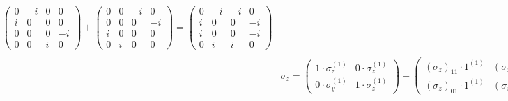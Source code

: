 \documentclass[10pt, a4paper]{article}
\begin{document}
\begin{align*}
\begin{pmatrix}
        0 & -i & 0 & 0\\
        i & 0 & 0 & 0\\
        0 & 0 & 0 & -i\\
        0 & 0 & i & 0
    \end{pmatrix} + 
    \begin{pmatrix}
        0 & 0 & -i & 0\\
        0 & 0 & 0 & -i\\
        i & 0 & 0 & 0\\
        0 & i & 0 & 0
    \end{pmatrix}
    =
    \begin{pmatrix}
        0 & -i & -i & 0\\
        i & 0 & 0 & -i\\
        i & 0 & 0 & -i\\
        0 & i & i & 0
    \end{pmatrix}\\
    &\sigma_z = \begin{pmatrix}1\cdot\sigma_z^{(1)} & 0\cdot\sigma_z^{(1)}\\0\cdot\sigma_y^{(1)} & 1\cdot\sigma_z^{(1)}\end{pmatrix} + \begin{pmatrix}(\sigma_{z})_{11}\cdot 1^{(1)} & (\sigma_{z})_{10}\cdot 1^{(1)}\\(\sigma_{z})_{01}\cdot 1^{(1)}& (\sigma_{z})_{00}\cdot 1^{(1)}\end{pmatrix}=
    \begin{pmatrix}
        1 & 0 & 0 & 0\\
        0 & -1 & 0 & 0\\
        0 & 0 & 1 & 0\\
        0 & 0 & 0 & -1
    \end{pmatrix}
    +
    \begin{pmatrix}
        1 & 0 & 0 & 0\\
        0 & 1 & 0 & 0\\
        0 & 0 & -1 & 0\\
        0 & 0 & 0 & -1
    \end{pmatrix}
    =
    \begin{pmatrix}
        2 & 0 & 0 & 0\\
        0 & 0 & 0 & 0\\
        0 & 0 & 0 & 0\\
        0 & 0 & 0 & -2
    \end{pmatrix}
\end{align*}
\newpage
\end{document}
